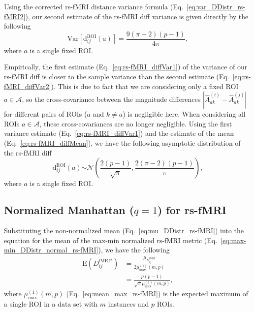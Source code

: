 \documentclass[aos]{imsart}
\begin{document}
Using the corrected rs-fMRI distance variance formula (Eq.~\ref{eq:var_DDistr_rs-fMRI2}), our second estimate of the rs-fMRI diff variance is given directly by the following
%
\begin{equation}\label{eq:rs-fMRI_diffVar2}
\text{Var}\left[\text{d}^\text{ROI}_{ij}(a)\right] = \frac{9(\pi - 2)(p - 1)}{4\pi},
\end{equation}
%
where $a$ is a single fixed ROI.

Empirically, the first estimate (Eq.~\ref{eq:rs-fMRI_diffVar1}) of the variance of our rs-fMRI diff is closer to the sample variance than the second estimate (Eq.~\ref{eq:rs-fMRI_diffVar2}). This is due to fact that we are considering only a fixed ROI $a \in \mathcal{A}$, so the cross-covariance between the magnitude differences $\left|\hat{A}^{(i)}_{ak} - \hat{A}^{(j)}_{ak}\right|$ for different pairs of ROIs ($a$ and $k \neq a$) is negligible here. When considering all ROIs $a \in \mathcal{A}$, these cross-covariances are no longer negligible. Using the first variance estimate (Eq.~\ref{eq:rs-fMRI_diffVar1}) and the estimate of the mean (Eq.~\ref{eq:rs-fMRI_diffMean}), we have the following asymptotic distribution of the rs-fMRI diff
%
\begin{equation}
\text{d}^\text{ROI}_{ij}(a) \overset{.}{\sim} \mathcal{N}\left(\frac{2(p-1)}{\sqrt{\pi}},\frac{2(\pi - 2)(p-1)}{\pi}\right),
\end{equation}
%
where $a$ is a single fixed ROI.

\subsection{Normalized Manhattan \texorpdfstring{($q=1$)}{} for rs-fMRI}

Substituting the non-normalized mean (Eq.~\ref{eq:mu_DDistr_rs-fMRI}) into the equation for the mean of the max-min normalized rs-fMRI metric (Eq.~\ref{eq:max-min_DDistr_normal_rs-fMRI}), we have the following
%
\begin{equation}\label{eq:mu_max-min_rs-fMRI}
\begin{aligned}
\text{E}\left(D^\text{fMRI*}_{ij}\right) &= \frac{\mu_{D^\text{fMRI}_{ij}}}{2\mu^{(1)}_\text{max}(m,p)} \\
&= \frac{p(p-1)}{\sqrt{\pi}\mu^{(1)}_\text{max}(m,p)},
\end{aligned}
\end{equation}
%
where $\mu^{(1)}_\text{max}(m,p)$ (Eq.~\ref{eq:mean_max_rs-fMRI}) is the expected maximum of a single ROI in a data set with $m$ instances and $p$ ROIs.
\end{document}
